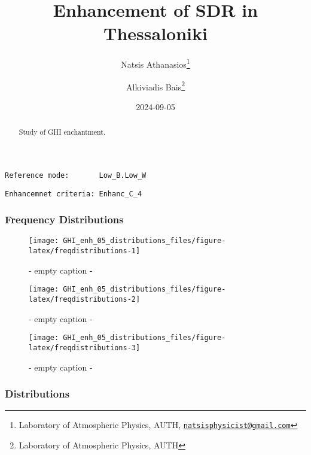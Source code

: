 \documentclass[
  10pt,
  a4paper,oneside]{article}
\title{Enhancement of SDR in Thessaloniki}
\author{Natsis Athanasios\footnote{Laboratory of Atmospheric Physics, AUTH, \href{mailto:natsisphysicist@gmail.com}{\nolinkurl{natsisphysicist@gmail.com}}} \and Alkiviadis Bais\footnote{Laboratory of Atmospheric Physics, AUTH}}
\date{2024-09-05}
\begin{document}
\maketitle
\begin{abstract}
Study of GHI enchantment.
\end{abstract}

{
\hypersetup{linkcolor=}
\setcounter{tocdepth}{4}
\tableofcontents
}
\begin{verbatim}
Reference mode:       Low_B.Low_W 
\end{verbatim}

\begin{verbatim}
Enhancemnet criteria: Enhanc_C_4 
\end{verbatim}

\FloatBarrier

\hypertarget{frequency-distributions}{%
\subsubsection{Frequency Distributions}\label{frequency-distributions}}

\begin{figure}[H]

{\centering \texttt{[image: GHI\_enh\_05\_distributions\_files/figure-latex/freqdistributions-1]} 

}

\caption{ - empty caption - }\label{fig:freqdistributions-1}
\end{figure}
\begin{figure}[H]

{\centering \texttt{[image: GHI\_enh\_05\_distributions\_files/figure-latex/freqdistributions-2]} 

}

\caption{ - empty caption - }\label{fig:freqdistributions-2}
\end{figure}
\begin{figure}[H]

{\centering \texttt{[image: GHI\_enh\_05\_distributions\_files/figure-latex/freqdistributions-3]} 

}

\caption{ - empty caption - }\label{fig:freqdistributions-3}
\end{figure}

\FloatBarrier

\hypertarget{distributions}{%
\subsubsection{Distributions}\label{distributions}}
\end{document}
